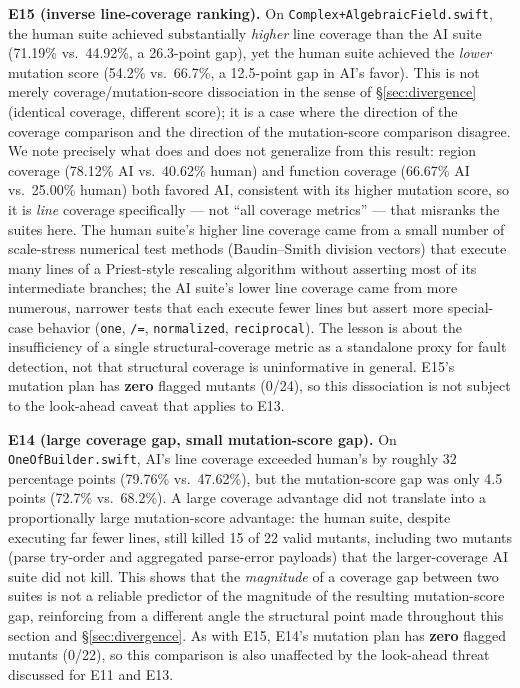\documentclass[10pt,conference]{IEEEtran}
\begin{document}
\textbf{E15 (inverse line-coverage ranking).} On \texttt{Complex+AlgebraicField.swift}, the human suite achieved substantially \emph{higher} line coverage than the AI suite (71.19\% vs.\ 44.92\%, a 26.3-point gap), yet the human suite achieved the \emph{lower} mutation score (54.2\% vs.\ 66.7\%, a 12.5-point gap in AI's favor). This is not merely coverage/mutation-score dissociation in the sense of \S\ref{sec:divergence} (identical coverage, different score); it is a case where the direction of the coverage comparison and the direction of the mutation-score comparison disagree. We note precisely what does and does not generalize from this result: region coverage (78.12\% AI vs.\ 40.62\% human) and function coverage (66.67\% AI vs.\ 25.00\% human) both favored AI, consistent with its higher mutation score, so it is \emph{line} coverage specifically — not ``all coverage metrics'' — that misranks the suites here. The human suite's higher line coverage came from a small number of scale-stress numerical test methods (Baudin–Smith division vectors) that execute many lines of a Priest-style rescaling algorithm without asserting most of its intermediate branches; the AI suite's lower line coverage came from more numerous, narrower tests that each execute fewer lines but assert more special-case behavior (\texttt{one}, \texttt{/=}, \texttt{normalized}, \texttt{reciprocal}). The lesson is about the insufficiency of a single structural-coverage metric as a standalone proxy for fault detection, not that structural coverage is uninformative in general. E15's mutation plan has \textbf{zero} flagged mutants (0/24), so this dissociation is not subject to the look-ahead caveat that applies to E13.

\textbf{E14 (large coverage gap, small mutation-score gap).} On \texttt{OneOfBuilder.swift}, AI's line coverage exceeded human's by roughly 32 percentage points (79.76\% vs.\ 47.62\%), but the mutation-score gap was only 4.5 points (72.7\% vs.\ 68.2\%). A large coverage advantage did not translate into a proportionally large mutation-score advantage: the human suite, despite executing far fewer lines, still killed 15 of 22 valid mutants, including two mutants (parse try-order and aggregated parse-error payloads) that the larger-coverage AI suite did not kill. This shows that the \emph{magnitude} of a coverage gap between two suites is not a reliable predictor of the magnitude of the resulting mutation-score gap, reinforcing from a different angle the structural point made throughout this section and \S\ref{sec:divergence}. As with E15, E14's mutation plan has \textbf{zero} flagged mutants (0/22), so this comparison is also unaffected by the look-ahead threat discussed for E11 and E13.
\end{document}

